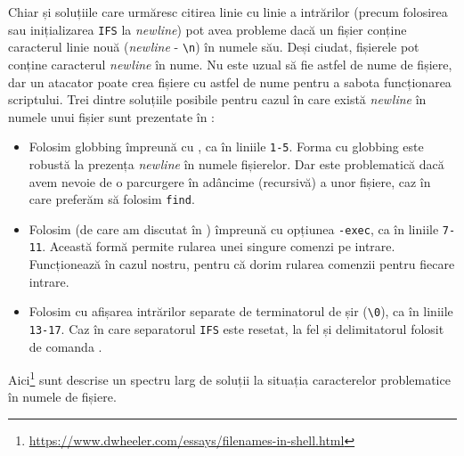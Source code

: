Chiar și soluțiile care urmăresc citirea linie cu linie a intrărilor (precum folosirea  sau inițializarea \texttt{IFS} la \textit{newline}) pot avea probleme dacă un fișier conține caracterul linie nouă (\textit{newline} - \texttt{\textbackslash{}n}) în numele său.
Deși ciudat, fișierele pot conține caracterul \textit{newline} în nume.
Nu este uzual să fie astfel de nume de fișiere, dar un atacator poate crea fișiere cu astfel de nume pentru a sabota funcționarea scriptului.
Trei dintre soluțiile posibile pentru cazul în care există \textit{newline} în numele unui fișier sunt prezentate în :
\begin{itemize}
  \item Folosim globbing împreună cu , ca în liniile \texttt{1-5}.
    Forma cu globbing este robustă la prezența \textit{newline} în numele fișierelor.
    Dar este problematică dacă avem nevoie de o parcurgere în adâncime (recursivă) a unor fișiere, caz în care preferăm să folosim \texttt{find}.
  \item Folosim  (de care am discutat în ) împreună cu opțiunea \texttt{-exec}, ca în liniile \texttt{7-11}.
    Această formă permite rularea unei singure comenzi pe intrare.
    Funcționează în cazul nostru, pentru că dorim rularea comenzii  pentru fiecare intrare.
  \item Folosim  cu afișarea intrărilor separate de terminatorul de șir (\texttt{\textbackslash{}0}), ca în liniile \texttt{13-17}.
    Caz în care separatorul \texttt{IFS} este resetat, la fel și delimitatorul folosit de comanda .
\end{itemize}

Aici\footnote{\url{https://www.dwheeler.com/essays/filenames-in-shell.html}} sunt descrise un spectru larg de soluții la situația caracterelor problematice în numele de fișiere.


